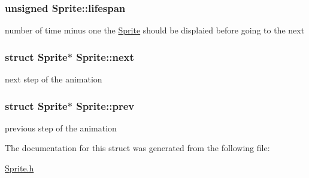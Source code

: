 \subsubsection[{\texorpdfstring{lifespan}{lifespan}}]{\setlength{\rightskip}{0pt plus 5cm}unsigned Sprite\+::lifespan}\hypertarget{structSprite_ac7deb2af6710a22bec013f2214fc0df7}{}\label{structSprite_ac7deb2af6710a22bec013f2214fc0df7}
number of time minus one the \hyperlink{structSprite}{Sprite} should be displaied before going to the next 
\subsubsection[{\texorpdfstring{next}{next}}]{\setlength{\rightskip}{0pt plus 5cm}struct {\bf Sprite}$\ast$ Sprite\+::next}\hypertarget{structSprite_a52b8df63621811a2835cd11ba69cebfb}{}\label{structSprite_a52b8df63621811a2835cd11ba69cebfb}
next step of the animation 
\subsubsection[{\texorpdfstring{prev}{prev}}]{\setlength{\rightskip}{0pt plus 5cm}struct {\bf Sprite}$\ast$ Sprite\+::prev}\hypertarget{structSprite_a2c09859f5f18f9d8272171eb43bf66e8}{}\label{structSprite_a2c09859f5f18f9d8272171eb43bf66e8}
previous step of the animation 

The documentation for this struct was generated from the following file\+:\begin{DoxyCompactItemize}
\item 
\hyperlink{Sprite_8h}{Sprite.\+h}\end{DoxyCompactItemize}
